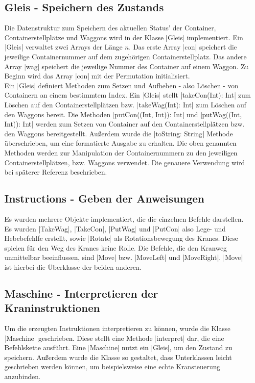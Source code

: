 \subsection{Gleis - Speichern des Zustands}
\label{gleis}
Die Datenstruktur zum Speichern des aktuellen Status' der Container, Containerstellplätze und Waggons wird in der Klasse |Gleis| implementiert.
Ein |Gleis| verwaltet zwei Arrays der Länge $n$. Das erste Array |con| speichert die jeweilige Containernummer auf dem zugehörigen Containerstellplatz.
Das andere Array |wag| speichert die jeweilige Nummer des Container auf einem Waggon.
Zu Beginn wird das Array |con| mit der Permutation initialisiert. \\
Ein |Gleis| definiert Methoden zum Setzen und Aufheben - also Löschen - von Containern an einem bestimmtem Index.
Ein |Gleis| stellt |takeCon(Int): Int| zum Löschen auf den Containerstellplätzen bzw. |takeWag(Int): Int| zum Löschen auf den Waggons bereit.
Die Methoden |putCon((Int, Int)): Int| und |putWag((Int, Int)): Int| werden zum Setzen von Container auf den Containerstellplätzen bzw. den Waggons bereitgestellt.
Außerdem wurde die |toString: String| Methode über\-schrie\-ben, um eine formatierte Ausgabe zu erhalten.
Die oben genannten Methoden werden zur Manipulation der Containernummern zu den jeweiligen Containerstellplätzen, bzw. Waggons verwendet.
Die genauere Verwendung wird bei späterer Referenz beschrieben.

\subsection{Instructions - Geben der Anweisungen}
Es wurden mehrere Objekte implementiert, die die einzelnen Befehle darstellen.
Es wurden |TakeWag|, |TakeCon|, |PutWag| und |PutCon| also Lege- und Hebebefehlfe erstellt, sowie |Rotate| als Rotationsbewegung des Kranes.
Diese spielen für den Weg des Kranes keine Rolle.
Die Befehle, die den Kranweg unmittelbar beeinflussen, sind |Move| bzw. |MoveLeft| und |MoveRight|. |Move| ist hierbei die Überklasse der beiden anderen.

\subsection{Maschine - Interpretieren der Kraninstruktionen}
Um die erzeugten Instruktionen interpretieren zu können, wurde die Klasse |Maschine| geschrieben.
Diese stellt eine Methode |interpret| dar, die eine Befehlskette ausführt.
Eine |Maschine| nutzt ein |Gleis|, um den Zustand zu speichern.
Außerdem wurde die Klasse so gestaltet, dass Unterklassen leicht geschrieben werden können, um beispielsweise eine echte Kransteuerung anzubinden.

